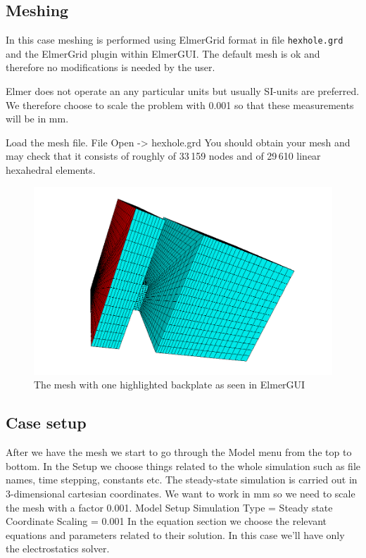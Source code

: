 \subsection*{Meshing}

In this case meshing is performed using ElmerGrid format in file \texttt{hexhole.grd} and the ElmerGrid plugin within ElmerGUI. 
The default mesh is ok and therefore no modifications is needed by the user. 

Elmer does not operate an any particular units but usually SI-units 
are preferred. We therefore choose to scale the problem with 0.001 so that these measurements will be in mm.  

Load the mesh file.
\ttbegin
File 
  Open -> hexhole.grd
\ttend
You should obtain your mesh and may check that it consists of roughly of 33\,159 nodes and of 
29\,610 linear hexahedral elements.


\begin{figure}[h]
\centering
\includegraphics[width=140mm]{HexholeElmerGUI}
\caption{The mesh with one highlighted backplate as seen in ElmerGUI}\label{fg:hexhole_elmergui}
\end{figure}  


\subsection*{Case setup}

After we have the mesh we start to go through the Model menu from the top to bottom. 
In the Setup we choose things related to the whole simulation such as file names, 
time stepping, constants etc.
The steady-state simulation is carried out in 3-dimensional cartesian
coordinates. We want to work in mm so we need to scale the mesh with a factor 0.001. 
\ttbegin
Model
  Setup 
    Simulation Type = Steady state
    Coordinate Scaling = 0.001
\ttend
In the equation section we choose the relevant equations and parameters related to their solution. 
In this case we'll have only the electrostatics solver. 

